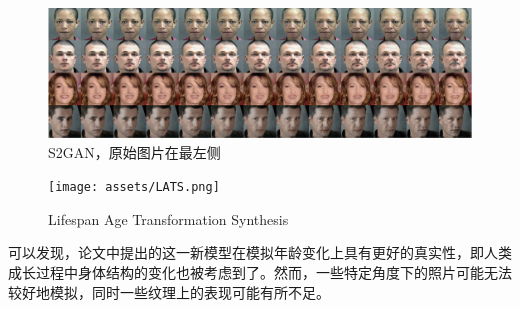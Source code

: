 \documentclass[12pt,a4paper]{article}
\begin{document}
\begin{figure}[H]
	\centering
	\includegraphics[scale=0.35]{assets/S2GAN.png}
	\caption{S2GAN，原始图片在最左侧}
\end{figure}

\begin{figure}[H]
	\centering
	\texttt{[image: assets/LATS.png]}
	\caption{Lifespan Age Transformation Synthesis}
\end{figure}

可以发现，论文中提出的这一新模型在模拟年龄变化上具有更好的真实性，即人类成长过程中身体结构的变化也被考虑到了。然而，一些特定角度下的照片可能无法较好地模拟，同时一些纹理上的表现可能有所不足。







\end{document}

